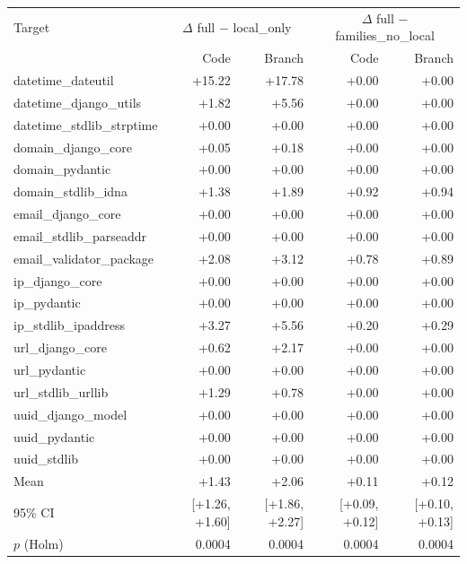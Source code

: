 \begin{tabular}{lrrrr}
\toprule
Target & \multicolumn{2}{c}{$\Delta$ full $-$ local\_only} & \multicolumn{2}{c}{$\Delta$ full $-$ families\_no\_local} \\
 & Code & Branch & Code & Branch \\
\midrule
datetime\_dateutil & +15.22 & +17.78 & +0.00 & +0.00 \\
datetime\_django\_utils & +1.82 & +5.56 & +0.00 & +0.00 \\
datetime\_stdlib\_strptime & +0.00 & +0.00 & +0.00 & +0.00 \\
domain\_django\_core & +0.05 & +0.18 & +0.00 & +0.00 \\
domain\_pydantic & +0.00 & +0.00 & +0.00 & +0.00 \\
domain\_stdlib\_idna & +1.38 & +1.89 & +0.92 & +0.94 \\
email\_django\_core & +0.00 & +0.00 & +0.00 & +0.00 \\
email\_stdlib\_parseaddr & +0.00 & +0.00 & +0.00 & +0.00 \\
email\_validator\_package & +2.08 & +3.12 & +0.78 & +0.89 \\
ip\_django\_core & +0.00 & +0.00 & +0.00 & +0.00 \\
ip\_pydantic & +0.00 & +0.00 & +0.00 & +0.00 \\
ip\_stdlib\_ipaddress & +3.27 & +5.56 & +0.20 & +0.29 \\
url\_django\_core & +0.62 & +2.17 & +0.00 & +0.00 \\
url\_pydantic & +0.00 & +0.00 & +0.00 & +0.00 \\
url\_stdlib\_urllib & +1.29 & +0.78 & +0.00 & +0.00 \\
uuid\_django\_model & +0.00 & +0.00 & +0.00 & +0.00 \\
uuid\_pydantic & +0.00 & +0.00 & +0.00 & +0.00 \\
uuid\_stdlib & +0.00 & +0.00 & +0.00 & +0.00 \\
\midrule
Mean & +1.43 & +2.06 & +0.11 & +0.12 \\
95\% CI & [+1.26, +1.60] & [+1.86, +2.27] & [+0.09, +0.12] & [+0.10, +0.13] \\
$p$ (Holm) & 0.0004 & 0.0004 & 0.0004 & 0.0004 \\
\bottomrule
\end{tabular}
